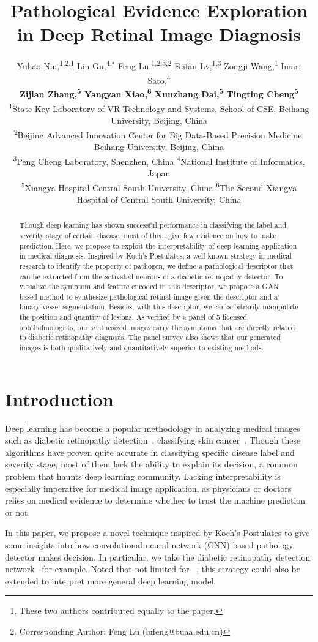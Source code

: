 \documentclass[letterpaper]{article} %
\title{Pathological Evidence Exploration in Deep Retinal Image Diagnosis}
\author{
Yuhao Niu,\textsuperscript{1,2,}\thanks{These two authors contributed equally to the paper.}
Lin Gu,\textsuperscript{4,}$^*$
Feng Lu,\textsuperscript{1,2,3,}\thanks{Corresponding Author: Feng Lu (lufeng@buaa.edu.cn)}
Feifan Lv,\textsuperscript{1,3}
Zongji Wang,\textsuperscript{1}
Imari Sato,\textsuperscript{4}\\{\bf \Large
Zijian Zhang,\textsuperscript{5}
Yangyan Xiao,\textsuperscript{6}
Xunzhang Dai,\textsuperscript{5}
Tingting Cheng\textsuperscript{5}
} \\
\textsuperscript{1}State Key Laboratory of VR Technology and Systems, School of CSE, Beihang University, Beijing, China \\
\textsuperscript{2}Beijing Advanced Innovation Center for Big Data-Based Precision Medicine, Beihang University, Beijing, China\\
\textsuperscript{3}Peng Cheng Laboratory, Shenzhen, China \quad
\textsuperscript{4}National Institute of Informatics, Japan \\
\textsuperscript{5}Xiangya Hospital Central South University, China \quad
\textsuperscript{6}The Second Xiangya Hospital of Central South University, China
}
\begin{document}
	\maketitle
	\begin{abstract}
		Though deep learning has shown successful performance in classifying the label and severity stage of certain disease, most of them give few evidence on how to make prediction. Here, we propose to exploit the interpretability of deep learning application in medical diagnosis. Inspired by Koch's Postulates, a well-known strategy in medical research to identify the property of pathogen, we define a pathological descriptor that can be extracted from the activated neurons of a diabetic retinopathy detector. To visualize the symptom and feature encoded in this descriptor, we propose a GAN based method to synthesize pathological retinal image given the descriptor and a binary vessel segmentation. Besides, with this descriptor, we can arbitrarily manipulate the position and quantity of lesions. As verified by a panel of 5 licensed  ophthalmologists, our synthesized images carry the symptoms that are directly related to diabetic retinopathy diagnosis. The panel survey also shows that our generated images is both qualitatively and quantitatively superior to existing methods.
	\end{abstract}

	\section{Introduction}

	Deep learning has become a popular methodology in analyzing medical images such as diabetic retinopathy detection~\cite{Gulshan2016jama}, classifying skin cancer~\cite{esteva2017nature}. Though these algorithms have proven quite accurate in classifying specific disease label and severity stage, most of them lack the ability to explain its decision, a common problem that haunts deep learning community. Lacking interpretability is especially imperative for medical image application, as physicians or doctors relies on medical evidence to determine whether to trust the machine prediction or not.

	In this paper, we propose a novel technique inspired by  Koch's Postulates to give some insights into how convolutional neural network (CNN) based pathology detector makes decision. In particular, we take the diabetic retinopathy detection network~\cite{oO2016detector} for example. Noted that not limited for ~\cite{oO2016detector}, this strategy could also be extended to interpret more general deep learning model.
\end{document}
